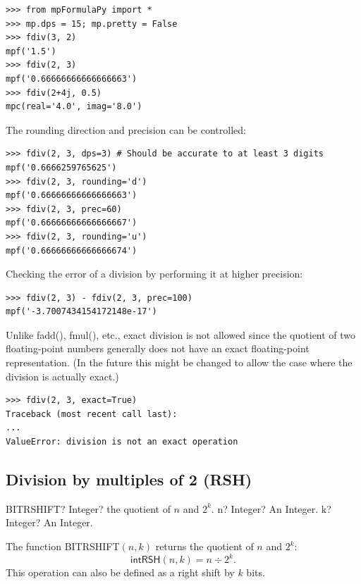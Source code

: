 \begin{lstlisting}
>>> from mpFormulaPy import *
>>> mp.dps = 15; mp.pretty = False
>>> fdiv(3, 2)
mpf('1.5')
>>> fdiv(2, 3)
mpf('0.66666666666666663')
>>> fdiv(2+4j, 0.5)
mpc(real='4.0', imag='8.0')
\end{lstlisting}


The rounding direction and precision can be controlled:

\begin{lstlisting}
>>> fdiv(2, 3, dps=3) # Should be accurate to at least 3 digits
mpf('0.6666259765625')
>>> fdiv(2, 3, rounding='d')
mpf('0.66666666666666663')
>>> fdiv(2, 3, prec=60)
mpf('0.66666666666666667')
>>> fdiv(2, 3, rounding='u')
mpf('0.66666666666666674')
\end{lstlisting}


Checking the error of a division by performing it at higher precision:

\begin{lstlisting}
>>> fdiv(2, 3) - fdiv(2, 3, prec=100)
mpf('-3.7007434154172148e-17')
\end{lstlisting}


Unlike fadd(), fmul(), etc., exact division is not allowed since the quotient of two floating-point numbers generally does not have an exact floating-point representation. (In the future this might be changed to allow the case where the division is actually exact.)

\begin{lstlisting}
>>> fdiv(2, 3, exact=True)
Traceback (most recent call last):
...
ValueError: division is not an exact operation
\end{lstlisting}




\subsection{Division by multiples of 2 (RSH)}

\vspace{0.6cm}
\begin{mpFunctionsExtract}
	\mpWorksheetFunctionTwoNotImplemented
	{BITRSHIFT? Integer? the quotient of $n$ and $2^k$.}
	{n? Integer? An Integer.}
	{k? Integer? An Integer.}
\end{mpFunctionsExtract}

\vspace{0.3cm}
The function \textsf{BITRSHIFT$(n, k)$} returns the quotient of $n$ and $2^k$: 
\begin{equation}
	\textsf{intRSH}(n, k) =n \div 2^k.
\end{equation}
This operation can also be defined as a right shift by $k$ bits.




